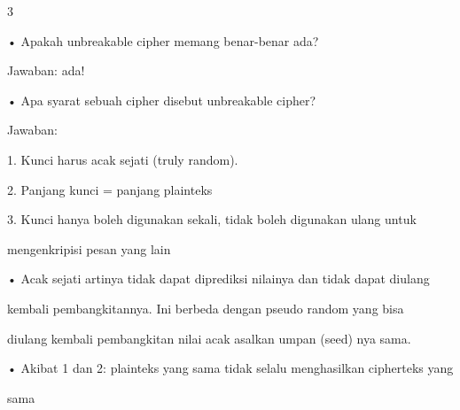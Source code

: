 \documentclass{article}
\begin{document}

3

• Apakah unbreakable cipher memang  benar-benar ada? 


Jawaban: ada!

• Apa syarat sebuah cipher disebut unbreakable cipher?


Jawaban: 


1. Kunci harus acak sejati (truly random).


2. Panjang kunci = panjang plainteks 

         3. Kunci hanya boleh digunakan sekali, tidak boleh digunakan ulang untuk

            mengenkripisi pesan yang lain



• Acak sejati artinya tidak dapat diprediksi nilainya dan tidak dapat diulang 

kembali  pembangkitannya. Ini berbeda dengan pseudo random yang bisa 

diulang kembali pembangkitan nilai acak asalkan umpan (seed) nya sama.


• Akibat 1 dan 2: plainteks yang sama tidak selalu menghasilkan cipherteks yang 

sama
\end{document}
